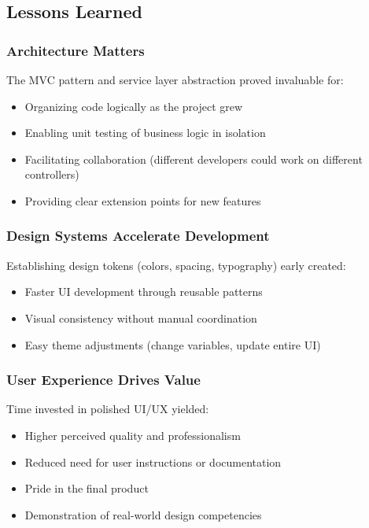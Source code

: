 \documentclass[12pt,a4paper]{article}
\begin{document}
\subsection{Lessons Learned}

\subsubsection{Architecture Matters}

The MVC pattern and service layer abstraction proved invaluable for:

\begin{itemize}[leftmargin=*]
    \item Organizing code logically as the project grew
    \item Enabling unit testing of business logic in isolation
    \item Facilitating collaboration (different developers could work on different controllers)
    \item Providing clear extension points for new features
\end{itemize}

\subsubsection{Design Systems Accelerate Development}

Establishing design tokens (colors, spacing, typography) early created:

\begin{itemize}[leftmargin=*]
    \item Faster UI development through reusable patterns
    \item Visual consistency without manual coordination
    \item Easy theme adjustments (change variables, update entire UI)
\end{itemize}

\subsubsection{User Experience Drives Value}

Time invested in polished UI/UX yielded:

\begin{itemize}[leftmargin=*]
    \item Higher perceived quality and professionalism
    \item Reduced need for user instructions or documentation
    \item Pride in the final product
    \item Demonstration of real-world design competencies
\end{itemize}
\end{document}
